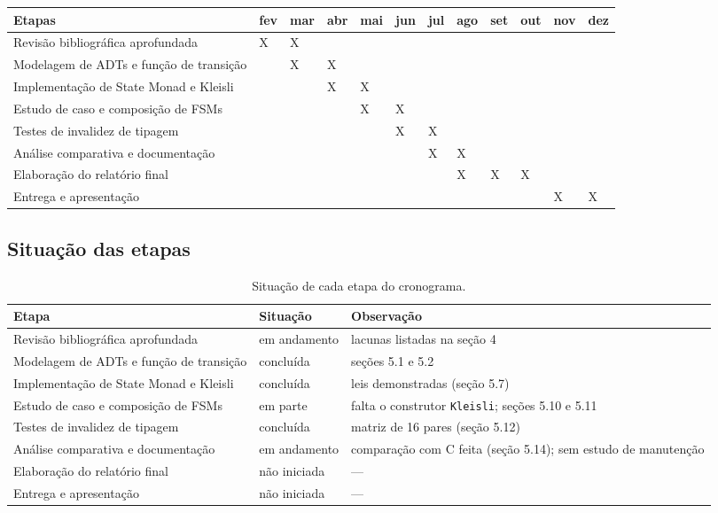 \documentclass[12pt,a4paper]{article}
\begin{document}
\begin{table}[h]
\centering
\small
\setlength{\tabcolsep}{3pt}
\begin{tabular}{|p{4.0cm}|p{0.7cm}|p{0.7cm}|p{0.7cm}|p{0.7cm}|p{0.7cm}|p{0.7cm}|p{0.7cm}|p{0.7cm}|p{0.7cm}|p{0.7cm}|p{0.7cm}|}
\hline
\textbf{Etapas} & \textbf{fev} & \textbf{mar} & \textbf{abr} & \textbf{mai} & \textbf{jun} & \textbf{jul} & \textbf{ago} & \textbf{set} & \textbf{out} & \textbf{nov} & \textbf{dez} \\
\hline
Revisão bibliográfica aprofundada & X & X & & & & & & & & & \\
\hline
Modelagem de ADTs e função de transição & & X & X & & & & & & & & \\
\hline
Implementação de State Monad e Kleisli & & & X & X & & & & & & & \\
\hline
Estudo de caso e composição de FSMs & & & & X & X & & & & & & \\
\hline
Testes de invalidez de tipagem & & & & & X & X & & & & & \\
\hline
Análise comparativa e documentação & & & & & & X & X & & & & \\
\hline
Elaboração do relatório final & & & & & & & X & X & X & & \\
\hline
Entrega e apresentação & & & & & & & & & & X & X \\
\hline
\end{tabular}
\end{table}


\subsection*{Situação das etapas}

\begin{table}[h]
\centering
\footnotesize
\begin{tabular}{|p{6.0cm}|p{2.6cm}|p{6.0cm}|}
\hline
Etapa & Situação & Observação \\
\hline
Revisão bibliográfica aprofundada & em andamento & lacunas listadas na seção 4 \\
\hline
Modelagem de ADTs e função de transição & concluída & seções 5.1 e 5.2 \\
\hline
Implementação de State Monad e Kleisli & concluída & leis demonstradas (seção 5.7) \\
\hline
Estudo de caso e composição de FSMs & em parte & falta o construtor \texttt{Kleisli}; seções 5.10 e 5.11 \\
\hline
Testes de invalidez de tipagem & concluída & matriz de 16 pares (seção 5.12) \\
\hline
Análise comparativa e documentação & em andamento & comparação com C feita (seção 5.14); sem estudo de manutenção \\
\hline
Elaboração do relatório final & não iniciada & --- \\
\hline
Entrega e apresentação & não iniciada & --- \\
\hline
\end{tabular}
\caption{Situação de cada etapa do cronograma.}
\end{table}
\end{document}
